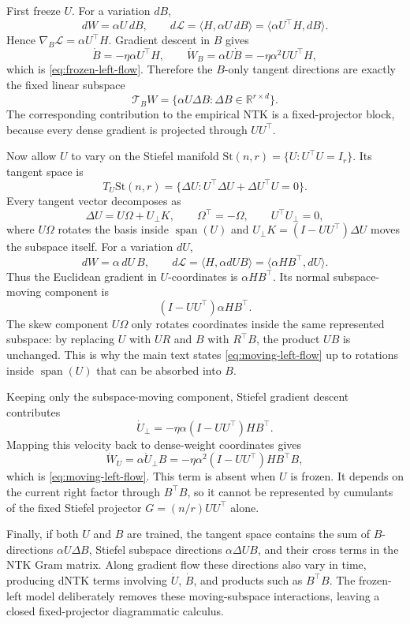 \documentclass{article}
\newcommand{\R}{\mathbb R}
\begin{document}
First freeze \(U\). For a variation \(dB\),
\[
dW=\alpha U\,dB,
\qquad
d\mathcal L
=\langle H,\alpha U\,dB\rangle
=\langle \alpha U^\top H,dB\rangle.
\]
Hence \(\nabla_B\mathcal L=\alpha U^\top H\). Gradient descent in \(B\) gives
\[
\dot B=-\eta\alpha U^\top H,
\qquad
\dot W_B=\alpha U\dot B
=-\eta\alpha^2UU^\top H,
\]
which is \eqref{eq:frozen-left-flow}. Therefore the \(B\)-only tangent directions are exactly the fixed linear subspace
\[
\mathcal T_B W=\{\alpha U\Delta B:\Delta B\in\R^{r\times d}\}.
\]
The corresponding contribution to the empirical NTK is a fixed-projector block, because every dense gradient is projected through \(UU^\top\).

Now allow \(U\) to vary on the Stiefel manifold \(\mathrm{St}(n,r)=\{U:U^\top U=I_r\}\). Its tangent space is
\[
T_U\mathrm{St}(n,r)
=\{\Delta U:U^\top\Delta U+\Delta U^\top U=0\}.
\]
Every tangent vector decomposes as
\[
\Delta U=U\Omega+U_\perp K,
\qquad
\Omega^\top=-\Omega,
\qquad
U^\top U_\perp=0,
\]
where \(U\Omega\) rotates the basis inside \(\operatorname{span}(U)\) and \(U_\perp K=(I-UU^\top)\Delta U\) moves the subspace itself. For a variation \(dU\),
\[
dW=\alpha\,dU\,B,
\qquad
d\mathcal L
=\langle H,\alpha dU B\rangle
=\langle \alpha H B^\top,dU\rangle.
\]
Thus the Euclidean gradient in \(U\)-coordinates is \(\alpha HB^\top\). Its normal subspace-moving component is
\[
(I-UU^\top)\alpha HB^\top.
\]
The skew component \(U\Omega\) only rotates coordinates inside the same represented subspace: by replacing \(U\) with \(UR\) and \(B\) with \(R^\top B\), the product \(UB\) is unchanged. This is why the main text states \eqref{eq:moving-left-flow} up to rotations inside \(\operatorname{span}(U)\) that can be absorbed into \(B\).

Keeping only the subspace-moving component, Stiefel gradient descent contributes
\[
\dot U_{\perp}
=-\eta\alpha(I-UU^\top)HB^\top.
\]
Mapping this velocity back to dense-weight coordinates gives
\[
\dot W_U
=\alpha \dot U_{\perp}B
=-\eta\alpha^2(I-UU^\top)H B^\top B,
\]
which is \eqref{eq:moving-left-flow}. This term is absent when \(U\) is frozen. It depends on the current right factor through \(B^\top B\), so it cannot be represented by cumulants of the fixed Stiefel projector \(G=(n/r)UU^\top\) alone.

Finally, if both \(U\) and \(B\) are trained, the tangent space contains the sum of \(B\)-directions \(\alpha U\Delta B\), Stiefel subspace directions \(\alpha\Delta U B\), and their cross terms in the NTK Gram matrix. Along gradient flow these directions also vary in time, producing dNTK terms involving \(\dot U\), \(\dot B\), and products such as \(B^\top B\). The frozen-left model deliberately removes these moving-subspace interactions, leaving a closed fixed-projector diagrammatic calculus.
\end{document}
